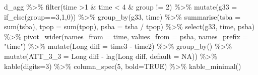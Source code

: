 \documentclass[
]{article}
\newenvironment{Shaded}{\begin{snugshade}}{\end{snugshade}}
\newcommand{\AttributeTok}[1]{\textcolor[rgb]{0.77,0.63,0.00}{#1}}
\newcommand{\ConstantTok}[1]{\textcolor[rgb]{0.00,0.00,0.00}{#1}}
\newcommand{\DecValTok}[1]{\textcolor[rgb]{0.00,0.00,0.81}{#1}}
\newcommand{\FunctionTok}[1]{\textcolor[rgb]{0.00,0.00,0.00}{#1}}
\newcommand{\NormalTok}[1]{#1}
\newcommand{\OtherTok}[1]{\textcolor[rgb]{0.56,0.35,0.01}{#1}}
\newcommand{\SpecialCharTok}[1]{\textcolor[rgb]{0.00,0.00,0.00}{#1}}
\newcommand{\StringTok}[1]{\textcolor[rgb]{0.31,0.60,0.02}{#1}}
\begin{document}
\begin{Shaded}
\begin{Highlighting}[]
\NormalTok{d\_agg }\SpecialCharTok{\%\textgreater{}\%} \FunctionTok{filter}\NormalTok{(time }\SpecialCharTok{\textgreater{}}\DecValTok{1} \SpecialCharTok{\&}\NormalTok{ time }\SpecialCharTok{\textless{}} \DecValTok{4} \SpecialCharTok{\&}\NormalTok{ group }\SpecialCharTok{!=} \DecValTok{2}\NormalTok{) }\SpecialCharTok{\%\textgreater{}\%}
  \FunctionTok{mutate}\NormalTok{(}\AttributeTok{g33 =} \FunctionTok{if\_else}\NormalTok{(group}\SpecialCharTok{==}\DecValTok{3}\NormalTok{,}\DecValTok{1}\NormalTok{,}\DecValTok{0}\NormalTok{)) }\SpecialCharTok{\%\textgreater{}\%}
  \FunctionTok{group\_by}\NormalTok{(g33, time) }\SpecialCharTok{\%\textgreater{}\%}
  \FunctionTok{summarise}\NormalTok{(}\AttributeTok{tsba =} \FunctionTok{sum}\NormalTok{(tsba),}
            \AttributeTok{tpop =} \FunctionTok{sum}\NormalTok{(tpop),}
            \AttributeTok{psba =}\NormalTok{ tsba }\SpecialCharTok{/}\NormalTok{ tpop) }\SpecialCharTok{\%\textgreater{}\%}
  \FunctionTok{select}\NormalTok{(g33, time, psba) }\SpecialCharTok{\%\textgreater{}\%}
  \FunctionTok{pivot\_wider}\NormalTok{(}\AttributeTok{names\_from =}\NormalTok{ time, }\AttributeTok{values\_from =}\NormalTok{ psba,}
              \AttributeTok{names\_prefix =} \StringTok{"time"}\NormalTok{) }\SpecialCharTok{\%\textgreater{}\%}
  \FunctionTok{mutate}\NormalTok{(}\StringTok{\textasciigrave{}}\AttributeTok{Long diff}\StringTok{\textasciigrave{}} \OtherTok{=} \StringTok{\textasciigrave{}}\AttributeTok{time3}\StringTok{\textasciigrave{}} \SpecialCharTok{{-}} \StringTok{\textasciigrave{}}\AttributeTok{time2}\StringTok{\textasciigrave{}}\NormalTok{) }\SpecialCharTok{\%\textgreater{}\%}
  \FunctionTok{group\_by}\NormalTok{() }\SpecialCharTok{\%\textgreater{}\%}
  \FunctionTok{mutate}\NormalTok{(}\AttributeTok{ATT\_3\_3 =} \StringTok{\textasciigrave{}}\AttributeTok{Long diff}\StringTok{\textasciigrave{}} \SpecialCharTok{{-}} \FunctionTok{lag}\NormalTok{(}\StringTok{\textasciigrave{}}\AttributeTok{Long diff}\StringTok{\textasciigrave{}}\NormalTok{, }\AttributeTok{default =} \ConstantTok{NA}\NormalTok{)) }\SpecialCharTok{\%\textgreater{}\%}
  \FunctionTok{kable}\NormalTok{(}\AttributeTok{digits=}\DecValTok{3}\NormalTok{) }\SpecialCharTok{\%\textgreater{}\%}
  \FunctionTok{column\_spec}\NormalTok{(}\DecValTok{5}\NormalTok{, }\AttributeTok{bold=}\ConstantTok{TRUE}\NormalTok{) }\SpecialCharTok{\%\textgreater{}\%}
  \FunctionTok{kable\_minimal}\NormalTok{()}
\end{Highlighting}
\end{Shaded}
\end{document}
